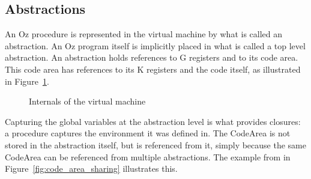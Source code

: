 \documentclass[a4paper]{memoir}
\begin{document}
\subsection{Abstractions}\label{sec:vm:abstractions}
An Oz procedure is represented in the virtual machine by what is called an abstraction. An Oz program itself is implicitly placed in what is called a top level abstraction.
An abstraction holds references to G registers and to its code area. This code
area has references to its K registers and the code itself, as illustrated in
Figure~\ref{fig:internal_virtual_machine}.

\begin{figure}[h]
\caption{Internals of the virtual machine}
\label{fig:internal_virtual_machine}
\end{figure}
Capturing the global variables at the abstraction level is what provides
closures: a procedure captures the environment it was defined in.
The CodeArea is not stored in the abstraction itself, but is referenced from
it, simply because the same CodeArea can be referenced from multiple
abstractions. The example from \cite{CTMCPFigs} in
Figure~\ref{fig:code_area_sharing} illustrates this.
\end{document}
